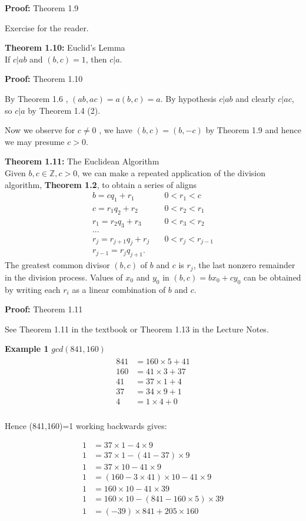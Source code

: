\documentclass[a4paper]{article}
\begin{document}
\textbf{Proof:} Theorem 1.9

Exercise for the reader.

\textbf{Theorem 1.10:} Euclid's Lemma\\
If $c|ab$ and $(b,c)=1$, then $c|a$.

\textbf{Proof:} Theorem 1.10

By Theorem 1.6 , $(ab,ac)=a(b,c)=a$. By hypothesis $c|ab$ and clearly $c|ac$, so $c|a$ by Theorem 1.4 (2).

Now we observe for $c\neq 0$ , we have $(b,c)=(b,-c)$ by Theorem 1.9 and hence we may presume $c>0$.

\textbf{Theorem 1.11:} The Euclidean Algorithm\\
Given $b,c\in\mathbb{Z}, c>0$, we can make a repeated application of the division algorithm, \textbf{Theorem 1.2}, to obtain a series of aligns
\begin{align}
b=cq_1+r_1          & \quad0<r_1<c\\
c=r_1q_2+r_2        & \quad0<r_2<r_1\\
r_1=r_2q_3+r_3      & \quad0<r_3<r_2\\
...\\
r_j=r_{j+1}q_j+r_j  & \quad0<r_j<r_{j-1}\\
r_{j-1}=r_jq_{j+1}.
\end{align}
The greatest common divisor $(b,c)$ of $b$ and $c$ is $r_j$, the last nonzero remainder in the division process. Values of $x_0$ and $y_0$ in $(b,c)=bx_0+cy_0$ can be obtained by writing each $r_i$ as a linear combination of $b$ and $c$.

\textbf{Proof:} Theorem 1.11

See Theorem 1.11 in the textbook or Theorem 1.13 in the Lecture Notes.


\textbf{Example 1}
$gcd(841,160)$
\begin{align}
\begin{split}
841&=160\times5 + 41 \\
160&=41\times3 + 37 \\
41&=37\times 1 + 4 \\
37&=34\times 9 + 1 \\
4&=1\times 4 + 0 \\
\end{split}
\end{align}

Hence (841,160)=1 working backwards gives:


\begin{align}
1&=37\times1 - 4\times9 \\
1&=37\times1 - (41-37)\times9 \\
1&=37\times10 - 41\times9 \\
1&=(160-3\times41)\times10 - 41 \times 9 \\
1&=160\times10 - 41\times39 \\
1&=160\times10 - (841-160\times5)\times39 \\
1&=(-39)\times841 + 205\times160 \\
\end{align}
\end{document}
